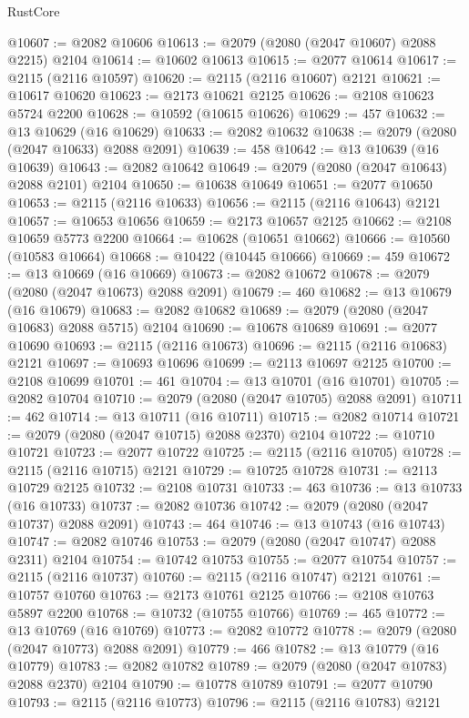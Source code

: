\begin{lexlean}{RustCore}
\begin{coremodule}
@10607 := @2082 @10606
@10613 := @2079 (@2080 (@2047 @10607) @2088 @2215) @2104
@10614 := @10602 @10613
@10615 := @2077 @10614
@10617 := @2115 (@2116 @10597)
@10620 := @2115 (@2116 @10607) @2121
@10621 := @10617 @10620
@10623 := @2173 @10621 @2125
@10626 := @2108 @10623 @5724 @2200
@10628 := @10592 (@10615 @10626)
@10629 := 457
@10632 := @13 @10629 (@16 @10629)
@10633 := @2082 @10632
@10638 := @2079 (@2080 (@2047 @10633) @2088 @2091)
@10639 := 458
@10642 := @13 @10639 (@16 @10639)
@10643 := @2082 @10642
@10649 := @2079 (@2080 (@2047 @10643) @2088 @2101) @2104
@10650 := @10638 @10649
@10651 := @2077 @10650
@10653 := @2115 (@2116 @10633)
@10656 := @2115 (@2116 @10643) @2121
@10657 := @10653 @10656
@10659 := @2173 @10657 @2125
@10662 := @2108 @10659 @5773 @2200
@10664 := @10628 (@10651 @10662)
@10666 := @10560 (@10583 @10664)
@10668 := @10422 (@10445 @10666)
@10669 := 459
@10672 := @13 @10669 (@16 @10669)
@10673 := @2082 @10672
@10678 := @2079 (@2080 (@2047 @10673) @2088 @2091)
@10679 := 460
@10682 := @13 @10679 (@16 @10679)
@10683 := @2082 @10682
@10689 := @2079 (@2080 (@2047 @10683) @2088 @5715) @2104
@10690 := @10678 @10689
@10691 := @2077 @10690
@10693 := @2115 (@2116 @10673)
@10696 := @2115 (@2116 @10683) @2121
@10697 := @10693 @10696
@10699 := @2113 @10697 @2125
@10700 := @2108 @10699
@10701 := 461
@10704 := @13 @10701 (@16 @10701)
@10705 := @2082 @10704
@10710 := @2079 (@2080 (@2047 @10705) @2088 @2091)
@10711 := 462
@10714 := @13 @10711 (@16 @10711)
@10715 := @2082 @10714
@10721 := @2079 (@2080 (@2047 @10715) @2088 @2370) @2104
@10722 := @10710 @10721
@10723 := @2077 @10722
@10725 := @2115 (@2116 @10705)
@10728 := @2115 (@2116 @10715) @2121
@10729 := @10725 @10728
@10731 := @2113 @10729 @2125
@10732 := @2108 @10731
@10733 := 463
@10736 := @13 @10733 (@16 @10733)
@10737 := @2082 @10736
@10742 := @2079 (@2080 (@2047 @10737) @2088 @2091)
@10743 := 464
@10746 := @13 @10743 (@16 @10743)
@10747 := @2082 @10746
@10753 := @2079 (@2080 (@2047 @10747) @2088 @2311) @2104
@10754 := @10742 @10753
@10755 := @2077 @10754
@10757 := @2115 (@2116 @10737)
@10760 := @2115 (@2116 @10747) @2121
@10761 := @10757 @10760
@10763 := @2173 @10761 @2125
@10766 := @2108 @10763 @5897 @2200
@10768 := @10732 (@10755 @10766)
@10769 := 465
@10772 := @13 @10769 (@16 @10769)
@10773 := @2082 @10772
@10778 := @2079 (@2080 (@2047 @10773) @2088 @2091)
@10779 := 466
@10782 := @13 @10779 (@16 @10779)
@10783 := @2082 @10782
@10789 := @2079 (@2080 (@2047 @10783) @2088 @2370) @2104
@10790 := @10778 @10789
@10791 := @2077 @10790
@10793 := @2115 (@2116 @10773)
@10796 := @2115 (@2116 @10783) @2121

\end{coremodule}
\end{lexlean}
